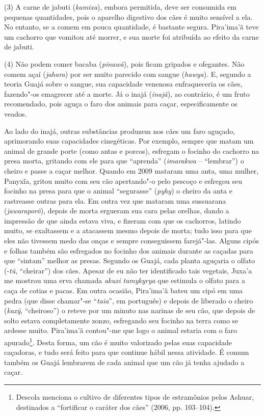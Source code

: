 (3) A carne de jabuti (\emph{kamixa}), embora permitida, deve ser
consumida em pequenas quantidades, pois o aparelho digestivo dos cães é
muito sensível a ela. No entanto, se a comem em pouca quantidade, é
bastante segura. Pira'ima'ã teve um cachorro que vomitou até morrer, e
sua morte foi atribuída ao efeito da carne de jabuti.

(4) Não podem comer bacaba (\emph{pinawã}), pois ficam gripados e
ofegantes. Não comem açaí (\emph{jahara}) por ser muito parecido com
sangue (\emph{hawya}). E, segundo a teoria Guajá sobre o sangue, sua
capacidade venenosa enfraqueceria os cães, fazendo"-os emagrecer até a
morte. Já o inajá (\emph{inajã}), ao contrário, é um fruto recomendado,
pois aguça o faro dos animais para caçar, especificamente os veados.

Ao lado do inajá, outras substâncias produzem nos cães um faro aguçado,
aprimorando suas capacidades cinegéticas. Por exemplo, sempre que matam
um animal de grande porte (como antas e porcos), esfregam o focinho do
cachorro na presa morta, gritando com ele para que ``aprenda''
(\emph{imarakwa} -- ``lembrar'') o cheiro e passe a caçar melhor. Quando em
2009 mataram uma anta, uma mulher, Panyxĩa, gritou muito com seu cão
apertando"-o pelo pescoço e esfregou seu focinho na presa para que o
animal ``segurasse'' (\emph{pyhy}) o cheiro da anta e rastreasse outras
para ela. Em outra vez que mataram uma sussuarana (\emph{jawaraporõ}),
depois de morta ergueram sua cara pelas orelhas, dando a impressão de
que ainda estava viva, e fizeram com que os cachorros, latindo muito, se
exaltassem e a atacassem mesmo depois de morta; tudo isso para que eles
não tivessem medo das onças e sempre conseguissem farejá"-las. Alguns
cipós e folhas também são esfregados no focinho dos animais durante as
caçadas para que ``sintam'' melhor as presas. Segundo os Guajá, cada
planta aguçaria o olfato (-\emph{tũ}, ``cheirar'') dos cães. Apesar de eu
não ter identificado tais vegetais, Juxa'a me mostrou uma erva chamada
\emph{akuxi} \emph{tamykyrya} que estimula o olfato para a caça de
cotias e pacas. Em outra ocasião, Pira'ima'ã bateu um cipó em uma pedra
(que disse chamar"-se ``\emph{taia}'', em português) e depois de liberado o
cheiro (\emph{kaxỹ}, ``cheiroso'') o reteve por um minuto nas narinas de
seu cão, que depois de solto estava completamente zonzo, esfregando seu
focinho na terra como se ardesse muito. Pira'ima'ã contou"-me que logo o
animal estaria com o faro apurado\footnote{Descola menciona o cultivo de
  diferentes tipos de estramônios pelos Ashuar, destinados a ``fortificar
  o caráter dos cães'' (2006, pp. 103--104).}. Desta forma, um cão é muito
valorizado pelas suas capacidade caçadoras, e tudo será feito para que
continue hábil nessa atividade. É comum também os Guajá lembrarem de
cada animal que um cão já tenha ajudado a caçar.

